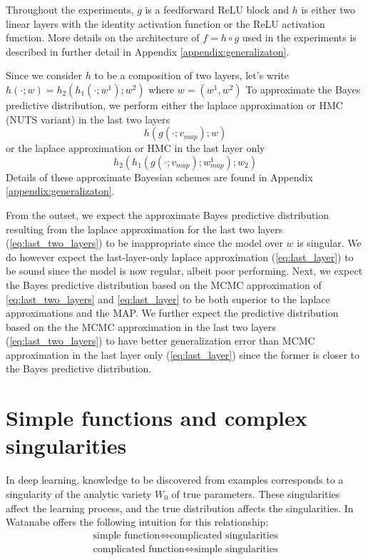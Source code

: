 \documentclass{article} %
\begin{document}
Throughout the experiments, $g$ is a feedforward ReLU block and $h$ is either two linear layers with the identity activation function or the ReLU activation function. More details on the architecture of $f = h \circ g$ used in the experiments is described in further detail in Appendix \ref{appendix:generalizaton}.

Since we consider $h$ to be a composition of two layers, let's write $h(\cdot;w)=h_2( h_1(\cdot; w^1); w^2)$ where $w=(w^1,w^2)$
To approximate the Bayes predictive distribution, we perform either the laplace approximation or HMC (NUTS variant) in the last two layers  \begin{equation}
h(g(\cdot;v_{map});w)
\label{eq:last_two_layers}
\end{equation}
or the laplace approximation or HMC in the last layer only 
\begin{equation}
h_2(h_1(g(\cdot;v_{map});w^1_{map}); w_2)
\label{eq:last_layer}
\end{equation}
Details of these approximate Bayesian schemes are found in Appendix \ref{appendix:generalizaton}.

From the outset, we expect the approximate Bayes predictive distribution resulting from the laplace approximation for the last two layers (\eqref{eq:last_two_layers}) to be inappropriate since the model over $w$ is singular. We do however expect the last-layer-only laplace approximation (\eqref{eq:last_layer}) to be sound since the model is now regular,  albeit poor performing. Next, we expect the Bayes predictive distribution based on the MCMC approximation of \eqref{eq:last_two_layers} and \eqref{eq:last_layer} to be both superior to the laplace approximations and the MAP. We further expect the predictive distribution based on the the MCMC approximation in the last two layers (\eqref{eq:last_two_layers}) to have better generalization error than MCMC approximation in the last layer only (\eqref{eq:last_layer}) since the former is closer to the Bayes predictive distribution.


\section{Simple functions and complex singularities}\label{section:simple_func}

In deep learning, knowledge to be discovered from examples corresponds to a singularity of the analytic variety $W_0$ of true parameters. These singularities affect the learning process, and the true distribution affects the singularities. In \citep[\S 7.6]{watanabe_algebraic_2009} Watanabe offers the following intuition for this relationship:
\begin{align*}
\text{simple function} \iff \text{complicated singularities}\\
\text{complicated function} \iff \text{simple singularities}\\
\end{align*}
\end{document}

